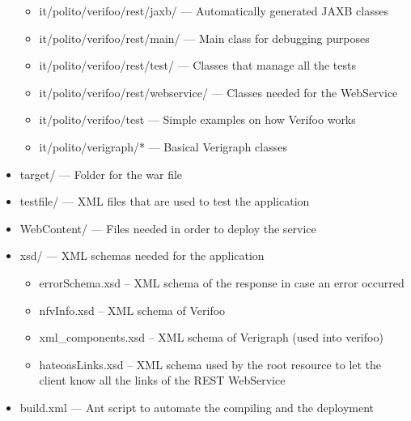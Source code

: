 \documentclass[a4paper,11pt]{article}
\begin{document}
\begin{itemize}
\begin{itemize}
        \item it/polito/verifoo/rest/jaxb/ --- Automatically generated JAXB classes
        \item it/polito/verifoo/rest/main/ --- Main class for debugging purposes
        \item it/polito/verifoo/rest/test/ --- Classes that manage all the tests
        \item it/polito/verifoo/rest/webservice/ --- Classes needed for the WebService
        \item it/polito/verifoo/test --- Simple examples on how Verifoo works
        \item it/polito/verigraph/* --- Basical Verigraph classes
    \end{itemize}
    \item target/ --- Folder for the war file
    \item testfile/ --- XML files that are used to test the application
    \item WebContent/ --- Files needed in order to deploy the service
    \item xsd/ --- XML schemas needed for the application
    \begin{itemize}
        \item errorSchema.xsd -- XML schema of the response in case an error occurred
	    \item nfvInfo.xsd  -- XML schema of Verifoo
	    \item xml\_components.xsd -- XML schema of Verigraph (used into verifoo)
	     \item hateoasLinks.xsd -- XML schema used by the root resource to let the client know all the links of the REST WebService
    \end{itemize}
    \item build.xml									--- Ant script to automate the compiling and the deployment
    
\end{itemize}
\end{document}
